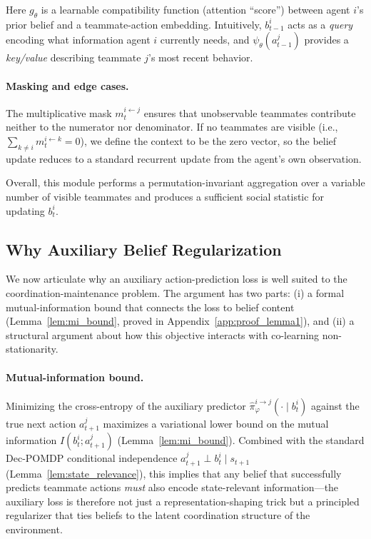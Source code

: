 \documentclass{article}
\theoremstyle{plain}
\theoremstyle{definition}
\theoremstyle{remark}
\begin{document}
Here $g_\theta$ is a learnable compatibility function (attention ``score'') between agent $i$'s prior belief and a teammate-action embedding. Intuitively, $b_{t-1}^i$ acts as a \emph{query} encoding what information agent $i$ currently needs, and $\psi_\theta(a_{t-1}^j)$ provides a \emph{key/value} describing teammate $j$'s most recent behavior.

\paragraph{Masking and edge cases.}
The multiplicative mask $m_t^{i\leftarrow j}$ ensures that unobservable teammates contribute neither to the numerator nor denominator. If no teammates are visible (i.e., $\sum_{k\neq i} m_t^{i\leftarrow k}=0$), we define the context to be the zero vector, so the belief update reduces to a standard recurrent update from the agent's own observation.

Overall, this module performs a permutation-invariant aggregation over a variable number of visible teammates and produces a sufficient social statistic for updating $b_t^i$.

\subsection{Why Auxiliary Belief Regularization}
\label{sec:theory_aux}

We now articulate why an auxiliary action-prediction loss is well suited to the coordination-maintenance problem. The argument has two parts: (i) a formal mutual-information bound that connects the loss to belief content (Lemma~\ref{lem:mi_bound}, proved in Appendix~\ref{app:proof_lemma1}), and (ii) a structural argument about how this objective interacts with co-learning non-stationarity.

\paragraph{Mutual-information bound.}
Minimizing the cross-entropy of the auxiliary predictor $\hat{\pi}_\varphi^{i\rightarrow j}(\cdot \mid b_t^i)$ against the true next action $a_{t+1}^j$ maximizes a variational lower bound on the mutual information $I(b_t^i; a_{t+1}^j)$ (Lemma~\ref{lem:mi_bound}). Combined with the standard Dec-POMDP conditional independence $a_{t+1}^j \perp b_t^i \mid s_{t+1}$ (Lemma~\ref{lem:state_relevance}), this implies that any belief that successfully predicts teammate actions \emph{must} also encode state-relevant information---the auxiliary loss is therefore not just a representation-shaping trick but a principled regularizer that ties beliefs to the latent coordination structure of the environment.
\end{document}

